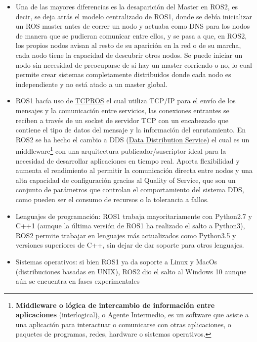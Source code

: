 \begin{itemize}
    \item Una de las mayores diferencias es la desaparición del Master en ROS2, es decir, se deja atrás el modelo centralizado de ROS1, donde se debía inicializar un ROS master antes de correr un nodo y actuaba como DNS para los nodos de manera que se pudieran comunicar entre ellos, y se pasa a que, en ROS2, los propios nodos avisan al resto de su aparición en la red o de su marcha, cada nodo tiene la capacidad de descubrir otros nodos. Se puede iniciar un nodo sin necesidad de preocuparse de si hay un master corriendo o no, lo cual permite crear sistemas completamente distribuidos donde cada nodo es independiente y no está atado a un master global.
    \item ROS1 hacía uso de \href{http://wiki.ros.org/ROS/TCPROS}{TCPROS} el cual utiliza TCP/IP para el envío de los mensajes y la comunicación entre servicios, las conexiones entrantes se reciben a través de un socket de servidor TCP con un encabezado que contiene el tipo de datos del mensaje y la información del enrutamiento. En ROS2 se ha hecho el cambio a DDS (\href{https://design.ros2.org/articles/ros_on_dds.html}{Data Distribution Service}) el cual es un middleware\footnote{\textbf{Middleware o lógica de intercambio de información entre aplicaciones} (interlogical), o Agente Intermedio, es un software que asiste a una aplicación para interactuar o comunicarse con otras aplicaciones, o paquetes de programas, redes, hardware o sistemas operativos.} con una arquitectura publicador/suscriptor ideal para la necesidad de desarrollar aplicaciones en tiempo real. Aporta flexibilidad y aumenta el rendimiento al permitir la comunicación directa entre nodos y una alta capacidad de configuración gracias al Quality of Service, que son un conjunto de parámetros que controlan el comportamiento del sistema DDS, como pueden ser el consumo de recursos o la tolerancia a fallos.
    \item Lenguajes de programación: ROS1 trabaja mayoritariamente con Python2.7 y C++1 (aunque la última versión de ROS1 ha realizado el salto a Python3), ROS2 permite trabajar en lenguajes más actualizados como Python3.5 y versiones superiores de C++, sin dejar de dar soporte para otros lenguajes.
    \item Sistemas operativos: si bien ROS1 ya da soporte a Linux y MacOs (distribuciones basadas en UNIX), ROS2 dio el salto al Windows 10 aunque aún se encuentra en fases experimentales
\end{itemize}

